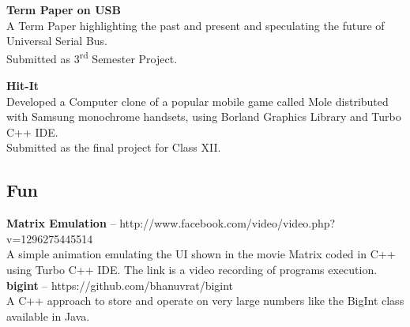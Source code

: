 \cvlistitem
{\textbf{Term Paper on USB}\\
  A Term Paper highlighting the past and present and speculating the future of Universal Serial Bus.\\
  Submitted as 3\textsuperscript{rd} Semester Project.\\
}

\cvlistitem
{\textbf{Hit-It}\\
 Developed a Computer clone of a popular mobile game called Mole distributed with Samsung monochrome handsets, using Borland Graphics Library and Turbo C++ IDE.\\
 Submitted as the final project for Class XII.\\
}
  
\subsection{Fun}
\cvlistitem
{\textbf{Matrix Emulation} -- {\small http://www.facebook.com/video/video.php?v=1296275445514}\\
  A simple animation emulating the UI shown in the movie Matrix coded in C++ using Turbo C++ IDE.
  The link is a video recording of programs execution.\\
}
\cvlistitem
{\textbf{bigint} -- {\small https://github.com/bhanuvrat/bigint}\\
  A C++ approach to store and operate on very large numbers like the BigInt class available in Java.\\
}
